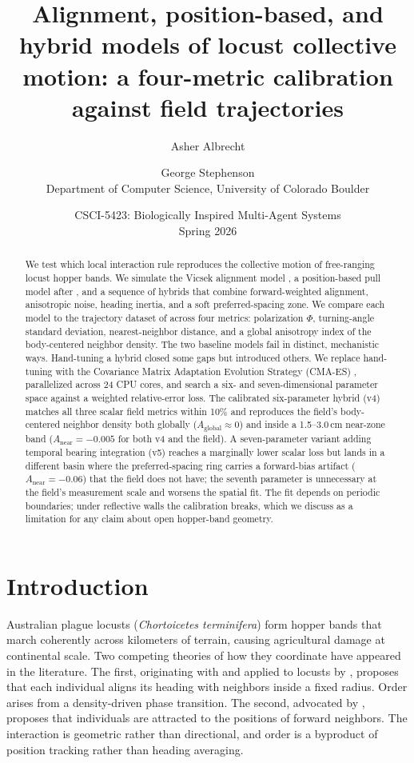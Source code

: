 \documentclass[11pt]{article}
\title{Alignment, position-based, and hybrid models of locust collective
motion: a four-metric calibration against field trajectories}
\author{Asher Albrecht \and George Stephenson \\
Department of Computer Science, University of Colorado Boulder}
\date{CSCI-5423: Biologically Inspired Multi-Agent Systems \\ Spring 2026}
\begin{document}
\maketitle

\begin{abstract}
We test which local interaction rule reproduces the collective motion of
free-ranging locust hopper bands. We simulate the Vicsek alignment model
\citep{vicsek1995}, a position-based pull model after \citet{sayin2025},
and a sequence of hybrids that combine forward-weighted alignment,
anisotropic noise, heading inertia, and a soft preferred-spacing zone. We
compare each model to the trajectory dataset of \citet{weinburd2024}
across four metrics: polarization $\Phi$, turning-angle standard deviation,
nearest-neighbor distance, and a global anisotropy index of the
body-centered neighbor density. The two baseline models fail in distinct,
mechanistic ways. Hand-tuning a hybrid closed some gaps but introduced
others. We replace hand-tuning with the Covariance Matrix Adaptation
Evolution Strategy (CMA-ES) \citep{hansen2016}, parallelized across 24
CPU cores, and search a six- and seven-dimensional parameter space against
a weighted relative-error loss. The calibrated six-parameter hybrid (v4)
matches all three scalar field metrics within 10\% and reproduces the
field's body-centered neighbor density both globally
($A_\text{global} \approx 0$) and inside a 1.5--3.0\,cm near-zone band
($A_\text{near} = -0.005$ for both v4 and the field). A
seven-parameter variant adding temporal bearing integration (v5)
reaches a marginally lower scalar loss but lands in a different basin
where the preferred-spacing ring carries a forward-bias artifact
($A_\text{near} = -0.06$) that the field does not have; the seventh
parameter is unnecessary at the field's measurement scale and worsens
the spatial fit. The fit depends on periodic boundaries; under
reflective walls the calibration breaks, which we discuss as a
limitation for any claim about open hopper-band geometry.
\end{abstract}

\section{Introduction}

Australian plague locusts (\textit{Chortoicetes terminifera}) form
hopper bands that march coherently across kilometers of terrain, causing
agricultural damage at continental scale. Two competing theories of how
they coordinate have appeared in the literature. The first, originating
with \citet{vicsek1995} and applied to locusts by \citet{buhl2006},
proposes that each individual aligns its heading with neighbors inside a
fixed radius. Order arises from a density-driven phase transition. The
second, advocated by \citet{sayin2025}, proposes that individuals are
attracted to the positions of forward neighbors. The interaction is
geometric rather than directional, and order is a byproduct of position
tracking rather than heading averaging.
\end{document}
